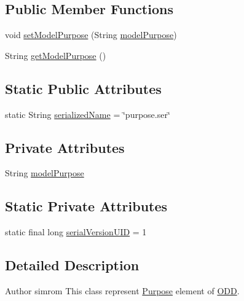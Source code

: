 \subsection*{Public Member Functions}
\begin{DoxyCompactItemize}
\item 
void \hyperlink{classit_1_1isislab_1_1masonhelperdocumentation_1_1_o_d_d_1_1_purpose_af8e78a411c1de807004ec9e88e5d2726}{set\-Model\-Purpose} (String \hyperlink{classit_1_1isislab_1_1masonhelperdocumentation_1_1_o_d_d_1_1_purpose_a48dbed6577c51e31a326d1cbd7552f7c}{model\-Purpose})
\item 
String \hyperlink{classit_1_1isislab_1_1masonhelperdocumentation_1_1_o_d_d_1_1_purpose_aa746b78b1e4ff3f2c4efc3769d8f79f4}{get\-Model\-Purpose} ()
\end{DoxyCompactItemize}
\subsection*{Static Public Attributes}
\begin{DoxyCompactItemize}
\item 
static String \hyperlink{classit_1_1isislab_1_1masonhelperdocumentation_1_1_o_d_d_1_1_purpose_a56357a152943e75b85a53c796126f99f}{serialized\-Name} = \char`\"{}purpose.\-ser\char`\"{}
\end{DoxyCompactItemize}
\subsection*{Private Attributes}
\begin{DoxyCompactItemize}
\item 
String \hyperlink{classit_1_1isislab_1_1masonhelperdocumentation_1_1_o_d_d_1_1_purpose_a48dbed6577c51e31a326d1cbd7552f7c}{model\-Purpose}
\end{DoxyCompactItemize}
\subsection*{Static Private Attributes}
\begin{DoxyCompactItemize}
\item 
static final long \hyperlink{classit_1_1isislab_1_1masonhelperdocumentation_1_1_o_d_d_1_1_purpose_a87ffe58f2db7565aeb8cb62e2ba7beb6}{serial\-Version\-U\-I\-D} = 1
\end{DoxyCompactItemize}


\subsection{Detailed Description}
\begin{DoxyAuthor}{Author}
simrom This class represent \hyperlink{classit_1_1isislab_1_1masonhelperdocumentation_1_1_o_d_d_1_1_purpose}{Purpose} element of \hyperlink{classit_1_1isislab_1_1masonhelperdocumentation_1_1_o_d_d_1_1_o_d_d}{O\-D\-D}. 
\end{DoxyAuthor}


